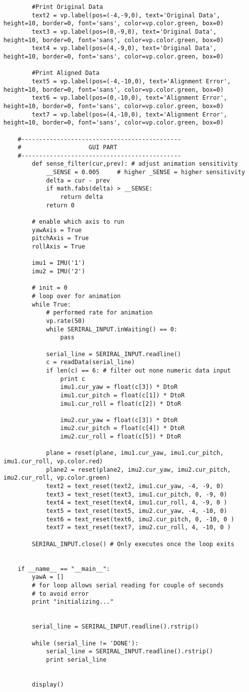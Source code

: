 \begin{lstlisting}
		#Print Original Data	
		text2 = vp.label(pos=(-4,-9,0), text='Original Data', height=10, border=0, font='sans', color=vp.color.green, box=0)
		text3 = vp.label(pos=(0,-9,0), text='Original Data', height=10, border=0, font='sans', color=vp.color.green, box=0)
		text4 = vp.label(pos=(4,-9,0), text='Original Data', height=10, border=0, font='sans', color=vp.color.green, box=0)
				
		#Print Aligned Data	
		text5 = vp.label(pos=(-4,-10,0), text='Alignment Error', height=10, border=0, font='sans', color=vp.color.green, box=0)
		text6 = vp.label(pos=(0,-10,0), text='Alignment Error', height=10, border=0, font='sans', color=vp.color.green, box=0)
		text7 = vp.label(pos=(4,-10,0), text='Alignment Error', height=10, border=0, font='sans', color=vp.color.green, box=0)
		
	#---------------------------------------------
	#					GUI PART
	#---------------------------------------------
		def sense_filter(cur,prev):	# adjust animation sensitivity
			__SENSE = 0.005		# higher _SENSE = higher sensitivity
			delta = cur - prev
			if math.fabs(delta) > __SENSE:
				return delta
			return 0

		# enable which axis to run 
		yawAxis = True
		pitchAxis = True
		rollAxis = True

		imu1 = IMU('1')
		imu2 = IMU('2')

		# init = 0
		# loop over for animation
		while True:
			# performed rate for animation
			vp.rate(50)	
			while SERIRAL_INPUT.inWaiting() == 0:
				pass

			serial_line = SERIRAL_INPUT.readline()
			c = readData(serial_line)
			if len(c) == 6:	# filter out none numeric data input
				print c
				imu1.cur_yaw = float(c[3]) * DtoR
				imu1.cur_pitch = float(c[1]) * DtoR
				imu1.cur_roll = float(c[2]) * DtoR

				imu2.cur_yaw = float(c[3]) * DtoR
				imu2.cur_pitch = float(c[4]) * DtoR
				imu2.cur_roll = float(c[5]) * DtoR

			plane = reset(plane, imu1.cur_yaw, imu1.cur_pitch, imu1.cur_roll, vp.color.red)
			plane2 = reset(plane2, imu2.cur_yaw, imu2.cur_pitch, imu2.cur_roll, vp.color.green)
			text2 = text_reset(text2, imu1.cur_yaw, -4, -9, 0)
			text3 = text_reset(text3, imu1.cur_pitch, 0, -9, 0)
			text4 = text_reset(text4, imu1.cur_roll, 4, -9, 0 )
			text5 = text_reset(text5, imu2.cur_yaw, -4, -10, 0)
			text6 = text_reset(text6, imu2.cur_pitch, 0, -10, 0 )
			text7 = text_reset(text7, imu2.cur_roll, 4, -10, 0 )

		SERIRAL_INPUT.close() # Only executes once the loop exits


	if __name__ == "__main__":
		yawA = []
		# for loop allows serial reading for couple of seconds
		# to avoid error
		print "initializing..."
			

		serial_line = SERIRAL_INPUT.readline().rstrip()

		while (serial_line != 'DONE'):
			serial_line = SERIRAL_INPUT.readline().rstrip()
			print serial_line


		display()

	\end{lstlisting}

